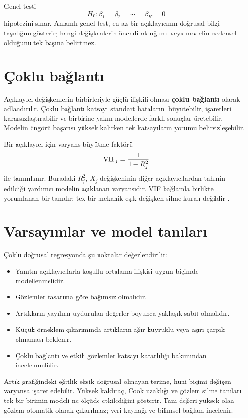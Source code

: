 Genel \Fstat testi
\[
H_0:\beta_1=\beta_2=\cdots=\beta_K=0
\]
hipotezini sınar. Anlamlı genel test, en az bir açıklayıcının doğrusal bilgi
taşıdığını gösterir; hangi değişkenlerin önemli olduğunu veya modelin nedensel
olduğunu tek başına belirtmez.

\section{Çoklu bağlantı}
\label{sec:multicollinearity}

Açıklayıcı değişkenlerin birbirleriyle güçlü ilişkili olması
\textbf{çoklu bağlantı} olarak adlandırılır. Çoklu bağlantı katsayı standart
hatalarını büyütebilir, işaretleri kararsızlaştırabilir ve birbirine yakın
modellerde farklı sonuçlar üretebilir. Modelin öngörü başarısı yüksek kalırken
tek katsayıların yorumu belirsizleşebilir.

Bir açıklayıcı için varyans büyütme faktörü
\[
\operatorname{VIF}_j=\frac{1}{1-R_j^2}
\]
ile tanımlanır. Buradaki $R_j^2$, $X_j$ değişkeninin diğer açıklayıcılardan
tahmin edildiği yardımcı modelin açıklanan varyansıdır. VIF bağlamla birlikte
yorumlanan bir tanıdır; tek bir mekanik eşik değişken silme kuralı değildir
\citep{fox2016}.

\section{Varsayımlar ve model tanıları}
\label{sec:multiple-diagnostics}

Çoklu doğrusal regresyonda şu noktalar değerlendirilir:

\begin{itemize}
  \item Yanıtın açıklayıcılarla koşullu ortalama ilişkisi uygun biçimde modellenmelidir.
  \item Gözlemler tasarıma göre bağımsız olmalıdır.
  \item Artıkların yayılımı uydurulan değerler boyunca yaklaşık sabit olmalıdır.
  \item Küçük örneklem çıkarımında artıkların ağır kuyruklu veya aşırı çarpık olmaması beklenir.
  \item Çoklu bağlantı ve etkili gözlemler katsayı kararlılığı bakımından incelenmelidir.
\end{itemize}

Artık grafiğindeki eğrilik eksik doğrusal olmayan terime, huni biçimi değişen
varyansa işaret edebilir. Yüksek kaldıraç, Cook uzaklığı ve gözlem silme
tanıları tek bir birimin modeli ne ölçüde etkilediğini gösterir. Tanı değeri
yüksek olan gözlem otomatik olarak çıkarılmaz; veri kaynağı ve bilimsel bağlam
incelenir.

